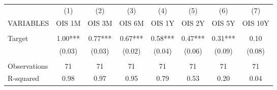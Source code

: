 \begin{tabular}{lccccccc} \hline
 & (1) & (2) & (3) & (4) & (5) & (6) & (7) \\
VARIABLES & OIS 1M & OIS 3M & OIS 6M & OIS 1Y & OIS 2Y & OIS 5Y & OIS 10Y \\ \hline
 &  &  &  &  &  &  &  \\
Target & 1.00*** & 0.77*** & 0.67*** & 0.58*** & 0.47*** & 0.31*** & 0.10 \\
 & (0.03) & (0.03) & (0.02) & (0.04) & (0.06) & (0.09) & (0.08) \\
 &  &  &  &  &  &  &  \\
Observations & 71 & 71 & 71 & 71 & 71 & 71 & 71 \\
 R-squared & 0.98 & 0.97 & 0.95 & 0.79 & 0.53 & 0.20 & 0.04 \\ \hline
\end{tabular}
